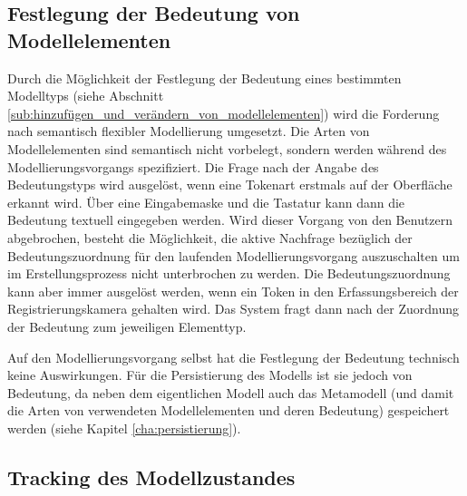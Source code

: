 
\subsection{Festlegung der Bedeutung von Modellelementen} %
\label{sub:festlegung_der_bedeutung_von_modellelementen}

Durch die Möglichkeit der Festlegung der Bedeutung eines bestimmten Modelltyps (siehe Abschnitt \ref{sub:hinzufügen_und_verändern_von_modellelementen}) wird die Forderung nach semantisch flexibler Modellierung umgesetzt. Die Arten von Modellelementen sind semantisch nicht vorbelegt, sondern werden während des Modellierungsvorgangs spezifiziert. Die Frage nach der  Angabe des Bedeutungstyps wird ausgelöst, wenn eine Tokenart erstmals auf der Oberfläche erkannt wird. Über eine Eingabemaske und die Tastatur kann dann die Bedeutung textuell eingegeben werden. Wird dieser Vorgang von den Benutzern abgebrochen, besteht die Möglichkeit, die aktive Nachfrage bezüglich der Bedeutungszuordnung für den laufenden Modellierungsvorgang auszuschalten um im Erstellungsprozess nicht unterbrochen zu werden. Die Bedeutungszuordnung kann aber immer ausgelöst werden, wenn ein Token in den Erfassungsbereich der Registrierungskamera gehalten wird. Das System fragt dann nach der Zuordnung der Bedeutung zum jeweiligen Elementtyp.

Auf den Modellierungsvorgang selbst hat die Festlegung der Bedeutung technisch keine Auswirkungen. Für die Persistierung des Modells ist sie jedoch von Bedeutung, da neben dem eigentlichen Modell auch das Metamodell (und damit die Arten von verwendeten Modellelementen und deren Bedeutung) gespeichert werden (siehe Kapitel \ref{cha:persistierung}).


\subsection{Tracking des Modellzustandes} %
\label{sub:tracking_des_modellzustandes}

